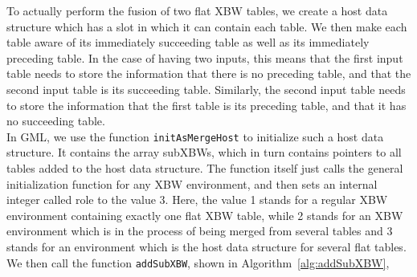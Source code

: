 \documentclass[a4paper,12pt,twoside,BCOR=10mm]{scrbook}
\begin{document}
To actually perform the fusion of two flat XBW tables, we create
a host data structure which has a slot in which it can contain each table.
We then make each table aware of its immediately succeeding table as well as its immediately preceding table.
In the case of having two inputs, this means that the first input table needs to store the information
that there is no preceding table, and that the second input table is its succeeding table.
Similarly, the second input table needs to store the information that the first table is
its preceding table, and that it has no succeeding table. \\
In GML, we use the function \texttt{initAsMergeHost} to initialize such a host data structure.
It contains the array subXBWs, which in turn contains pointers to all tables added to the host data structure.
The function itself just calls the general initialization function for any XBW environment,
and then sets an internal integer called role to the value 3.
Here, the value 1 stands for a regular XBW environment containing exactly one flat XBW table,
while 2 stands for an XBW environment which is in the process of being merged from several tables
and 3 stands for an environment which is the host data structure for several flat tables. \\
We then call the function \texttt{addSubXBW}, shown in Algorithm~\ref{alg:addSubXBW},
\end{document}
